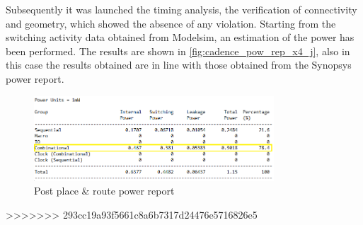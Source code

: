 Subsequently it was launched the timing analysis, the verification of connectivity and geometry, which showed the absence of any violation. Starting from the switching activity data obtained from Modelsim, an estimation of the power has been performed. The results are shown in \autoref{fig:cadence_pow_rep_x4_j}, also in this case the results obtained are in line with those obtained from the Synopsys power report.

\begin{figure}[h]
	\center
	\includegraphics[width=0.8\textwidth]{images/rep_power_x4_cadence_j_mod.png}
	\caption{Post place \& route power report}
	\label{fig:cadence_pow_rep_x4_j}
\end{figure}
>>>>>>> 293cc19a93f5661c8a6b7317d24476e5716826e5
